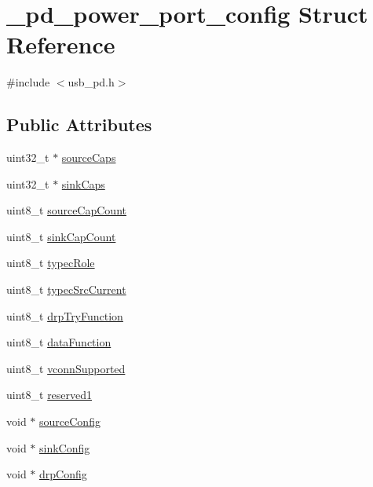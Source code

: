 \hypertarget{struct__pd__power__port__config}{\section{\-\_\-pd\-\_\-power\-\_\-port\-\_\-config Struct Reference}
\label{struct__pd__power__port__config}
}


{\ttfamily \#include $<$usb\-\_\-pd.\-h$>$}

\subsection*{Public Attributes}
\begin{DoxyCompactItemize}
\item 
uint32\-\_\-t $\ast$ \hyperlink{struct__pd__power__port__config_a12847f31ee382d4bdee4067c9ee177f4}{source\-Caps}
\item 
uint32\-\_\-t $\ast$ \hyperlink{struct__pd__power__port__config_ab247068e26ad76b2670eb96da39969e1}{sink\-Caps}
\item 
uint8\-\_\-t \hyperlink{struct__pd__power__port__config_a7cf6689616437623deb3b42e5467e26f}{source\-Cap\-Count}
\item 
uint8\-\_\-t \hyperlink{struct__pd__power__port__config_aa1d58bf75fbebad4b8c7e29b0cc4c64e}{sink\-Cap\-Count}
\item 
uint8\-\_\-t \hyperlink{struct__pd__power__port__config_a649079672f270a65578bd41e0e624e16}{typec\-Role}
\item 
uint8\-\_\-t \hyperlink{struct__pd__power__port__config_aaec71cee54cf853e332a4b4ed1ef17ae}{typec\-Src\-Current}
\item 
uint8\-\_\-t \hyperlink{struct__pd__power__port__config_a6e72ee6532ef61497b162a28b4500433}{drp\-Try\-Function}
\item 
uint8\-\_\-t \hyperlink{struct__pd__power__port__config_a5a3c023210ceec3faac6d13b0de58f75}{data\-Function}
\item 
uint8\-\_\-t \hyperlink{struct__pd__power__port__config_aa552a27c5747ea789ad185fefac44194}{vconn\-Supported}
\item 
uint8\-\_\-t \hyperlink{struct__pd__power__port__config_ae6a55ddacda35e342d72b9ee6f7fadba}{reserved1}
\item 
void $\ast$ \hyperlink{struct__pd__power__port__config_a8e04f0c0092776ec0f354cf23ce48057}{source\-Config}
\item 
void $\ast$ \hyperlink{struct__pd__power__port__config_ab0b7a0e266e429764b5af0dd6a57a303}{sink\-Config}
\item 
void $\ast$ \hyperlink{struct__pd__power__port__config_a95dc4dc28941f3a624bac60addc27b20}{drp\-Config}
\end{DoxyCompactItemize}


